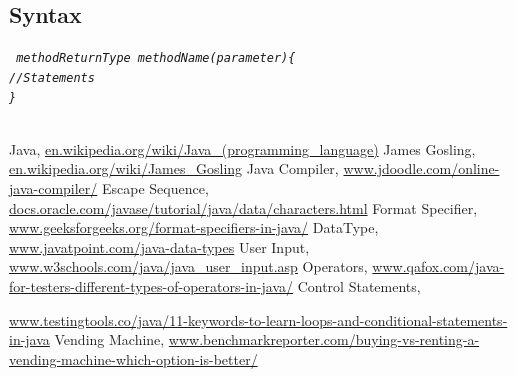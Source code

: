 \documentclass[openany]{book}  %
\begin{document}
\subsection{Syntax}
\begin{center}
    \raggedright
    \tt{
        \textit{
            \quad\quad\quad\quad\quad\quad\quad\quad\quad\quad\quad methodReturnType methodName(parameter)\{ \\
            \quad\quad\quad\quad\quad\quad\quad\quad\quad\quad\quad\quad\quad //Statements \\
            \quad\quad\quad\quad\quad\quad\quad\quad\quad\quad\quad \} \\
        }
    }
\end{center}
















% 
% 
\printindex
% 
% 
\begin{thebibliography}{90}
    \footnotesize
     Java, \url{en.wikipedia.org/wiki/Java_(programming_language)}
     James Gosling, \url{en.wikipedia.org/wiki/James_Gosling}
     Java Compiler, \url{www.jdoodle.com/online-java-compiler/}
     Escape Sequence, \url{docs.oracle.com/javase/tutorial/java/data/characters.html}
     Format Specifier,  \footnotesize{\url{www.geeksforgeeks.org/format-specifiers-in-java/}}
     DataType, \url{www.javatpoint.com/java-data-types}
     User Input, \url{www.w3schools.com/java/java_user_input.asp}
     Operators, \url{www.qafox.com/java-for-testers-different-types-of-operators-in-java/}
     Control Statements, \\ \raggedright{\url{www.testingtools.co/java/11-keywords-to-learn-loops-and-conditional-statements-in-java}}
     Vending Machine, \url{www.benchmarkreporter.com/buying-vs-renting-a-vending-machine-which-option-is-better/}
\end{thebibliography}






















\vspace*{\fill}
\end{document}
